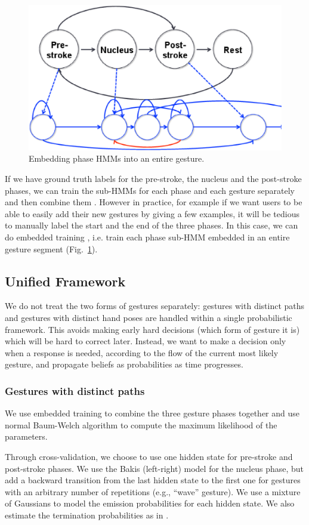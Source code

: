 \documentclass[conference]{IEEEtran}
\begin{document}
\begin{figure}[!t]
\centering
\includegraphics[width=0.7\columnwidth]{fig/embedded.ps}
\caption{Embedding phase HMMs into an entire gesture.}
\label{fig:embed}
\end{figure}

If we have ground truth labels for the pre-stroke, the nucleus and the
post-stroke phases, we can train the sub-HMMs for each phase and each gesture
separately and then combine them \cite{yin13}. However in practice, for example
if we want users to be able to easily add their new gestures by giving a few
examples, it will be tedious to manually label the start and the end of the
three phases. In this case, we can do embedded training \cite{young1994}, i.e.
train each phase sub-HMM embedded in an entire gesture segment
(Fig.~\ref{fig:embed}).

\subsection{Unified Framework}\label{sec:unified}
We do not treat the two forms of gestures separately: gestures with
distinct paths and gestures with distinct hand poses are handled within a
single probabilistic framework. This avoids making early hard decisions (which
form of gesture it is) which will be hard to correct later. Instead, we want to
make a decision only when a response is needed, according to the flow of the
current most likely gesture, and propagate beliefs as probabilities as time progresses.

\subsubsection{Gestures with distinct paths}
We use embedded training to
combine the three gesture phases together and use normal Baum-Welch algorithm to compute the
maximum likelihood of the parameters. 

Through cross-validation, we choose to use one hidden state for pre-stroke and
post-stroke phases. We use the Bakis (left-right) model \cite{Bauer00} for the
nucleus phase, but add a backward transition from the last hidden state to the first
one for gestures with an arbitrary number of repetitions (e.g., ``wave''
gesture). We use a mixture of Gaussians to model the emission probabilities for
each hidden state. We also estimate the termination
probabilities as in \cite{yin13}.
\end{document}
